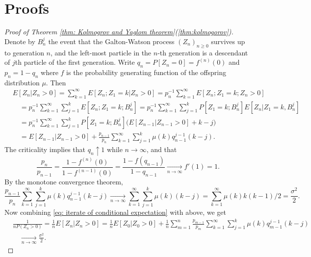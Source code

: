\documentclass[12pt,a4paper]{amsart}
\numberwithin{equation}{section}
\begin{document}
\section{Proofs}
\label{sec: proofs}
\begin{proof}[Proof of Theorem \ref{thm: Kolmogrov and Yaglom theorem}(\ref{thm:kolmogorov})]
	Denote by $B_n^j$ the event that the Galton-Watson process 
    $(Z_n)_{n\geq 0}$ 
survives up to generation $n$, and the left-most particle in the $n$-th generation is a descendant of $j$th particle of the first generation.
	Write $q_n = P[Z_n = 0] = f^{(n)}(0)$ and $p_n = 1- q_n$ where $f$ is the probability generating function of the offspring distribution $\mu$.
	Then
\begin{equation}
\label{eq: iterate of conditional expectation}
\begin{split}
	&E[Z_n| Z_n>0]
	= \sum_{k=1}^\infty E[Z_n; Z_1=k| Z_n>0]
	= p_n^{-1} \sum_{k=1}^\infty E[Z_n; Z_1=k;Z_{n}>0]
	\\&\quad = p_n^{-1} \sum_{k=1}^\infty \sum_{j=1}^k E[Z_n; Z_1=k;B_n^j]
	= p_n^{-1} \sum_{k=1}^\infty \sum_{j=1}^k P[Z_1=k;B_n^j] E[Z_n| Z_1=k,B_n^j]
	\\&\quad = p_n^{-1} \sum_{k=1}^\infty \sum_{j=1}^k P[Z_1=k;B_n^j] \Big( E[Z_{n-1}| Z_{n-1}>0] +k-j\Big)
	\\&\quad = E[Z_{n-1}|Z_{n-1}> 0]  + \frac{p_{n-1}}{p_n}\sum_{k=1}^\infty \sum_{j=1}^k \mu(k) q_{n-1}^{j-1}(k-j).
\end{split}
\end{equation}
	The criticality implies that $q_n \uparrow 1$ while $n \to \infty$, and that
\[
	\frac{p_n}{p_{n-1}} = \frac{1- f^{(n)}(0)}{1-f^{(n-1)}(0)} = \frac{1- f(q_{n-1})}{1-q_{n-1}} \xrightarrow[n \to \infty]{} f'(1) = 1.
\]
	By the monotone convergence theorem,
\[
	\frac{p_{n-1}}{p_n} \sum_{k=1}^\infty \sum_{j=1}^k \mu(k) q_{n-1}^{j-1} (k-j)
	\xrightarrow[n \to \infty]{} \sum_{k=1}^\infty \sum_{j=1}^k \mu(k) (k-j)
	=  \sum_{k=1}^\infty \mu(k) k(k-1)/2
	= \frac{\sigma^2}{2}.
\]
	Now combining \eqref{eq: iterate of conditional expectation} with above, we get
\[\begin{split}
	&\frac{1}{n P(Z_n > 0)}
	= \frac{1}{n} E[Z_n | Z_n > 0]
	= \frac{1}{n}E[Z_0| Z_0 > 0] + \frac{1}{n} \sum_{m = 1}^n \frac{p_{m-1}}{p_m}\sum_{k=1}^\infty \sum_{j=1}^k \mu(k) q_{m-1}^{j-1}(k-j)
	\\&\quad \xrightarrow[n \to \infty]{} \frac{\sigma^2}{2}.
\end{split}\]
\end{proof}
\end{document}
